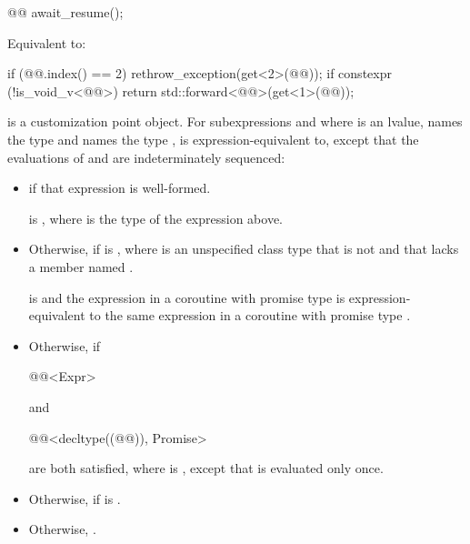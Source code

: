\begin{itemdecl}
@@ await_resume();
\end{itemdecl}

\begin{itemdescr}
\pnum
\effects
Equivalent to:
\begin{codeblock}
if (@@.index() == 2)
  rethrow_exception(get<2>(@@));
if constexpr (!is_void_v<@@>)
  return std::forward<@@>(get<1>(@@));
\end{codeblock}
\end{itemdescr}

\pnum
{} is a customization point object.
For subexpressions  and 
where  is an lvalue,
 names the type  and
 names the type ,
 is expression-equivalent to,
except that the evaluations of  and 
are indeterminately sequenced:
\begin{itemize}
\item
{} if that expression is well-formed.

\mandates
{} is ,
where  is the type of the expression above.
\item
Otherwise, 
if  is ,
where  is an unspecified class type
that is not  and
that lacks a member named .

\expects
{} is  and
the expression 
in a coroutine with promise type  is expression-equivalent to
the same expression in a coroutine with promise type .
\item
Otherwise, 
if
\begin{codeblock}
@@<Expr>
\end{codeblock}
and
\begin{codeblock}
@@<decltype((@@)), Promise>
\end{codeblock}
are both satisfied, where  is
,
except that  is evaluated only once.
\item
Otherwise, 
if  is .
\item
Otherwise, .
\end{itemize}

